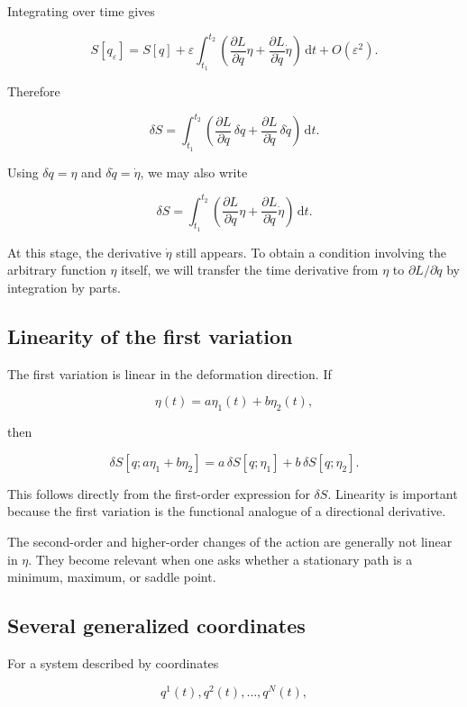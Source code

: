Integrating over time gives

\[
S[q_{\varepsilon}]
=
S[q]
+
\varepsilon
\int_{t_{1}}^{t_{2}}
\left(
\frac{\partial L}{\partial q}\eta
+
\frac{\partial L}{\partial\dot q}\dot\eta
\right)
\,\mathrm{d}t
+
O(\varepsilon^{2}).
\]

Therefore

\[
\boxed{
\delta S
=
\int_{t_{1}}^{t_{2}}
\left(
\frac{\partial L}{\partial q}\,\delta q
+
\frac{\partial L}{\partial\dot q}\,\delta\dot q
\right)
\,\mathrm{d}t
}.
\]

Using \(\delta q=\eta\) and \(\delta\dot q=\dot\eta\), we may also write

\[
\delta S
=
\int_{t_{1}}^{t_{2}}
\left(
\frac{\partial L}{\partial q}\eta
+
\frac{\partial L}{\partial\dot q}\dot\eta
\right)
\,\mathrm{d}t.
\]

At this stage, the derivative \(\dot\eta\) still appears. To obtain a condition involving the arbitrary function \(\eta\) itself, we will transfer the time derivative from \(\eta\) to \(\partial L/\partial\dot q\) by integration by parts.

\subsection{Linearity of the first variation}

The first variation is linear in the deformation direction. If

\[
\eta(t)
=
a\eta_{1}(t)+b\eta_{2}(t),
\]

then

\[
\delta S[q;a\eta_{1}+b\eta_{2}]
=
a\,\delta S[q;\eta_{1}]
+
b\,\delta S[q;\eta_{2}].
\]

This follows directly from the first-order expression for \(\delta S\). Linearity is important because the first variation is the functional analogue of a directional derivative.

The second-order and higher-order changes of the action are generally not linear in \(\eta\). They become relevant when one asks whether a stationary path is a minimum, maximum, or saddle point.

\subsection{Several generalized coordinates}

For a system described by coordinates

\[
q^{1}(t),q^{2}(t),\ldots,q^{N}(t),
\]


